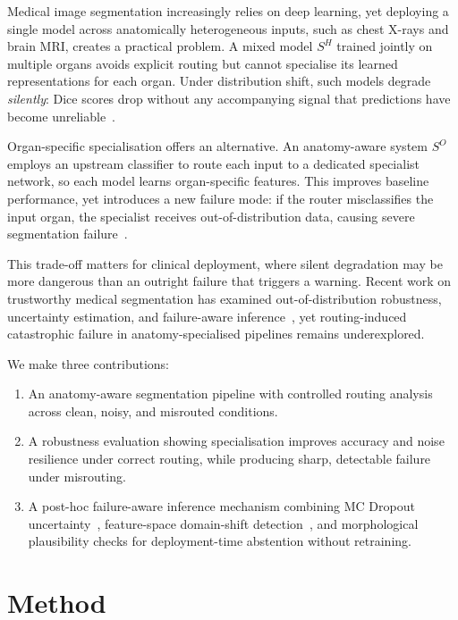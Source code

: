 \documentclass[a4paper,conference]{IEEEtran}
\begin{document}
Medical image segmentation increasingly relies on deep learning, yet deploying a single model across anatomically heterogeneous inputs, such as chest X-rays and brain MRI, creates a practical problem. A mixed model $S^H$ trained jointly on multiple organs avoids explicit routing but cannot specialise its learned representations for each organ. Under distribution shift, such models degrade \emph{silently}: Dice scores drop without any accompanying signal that predictions have become unreliable~\cite{b1,b2}.

Organ-specific specialisation offers an alternative. An anatomy-aware system $S^O$ employs an upstream classifier to route each input to a dedicated specialist network, so each model learns organ-specific features. This improves baseline performance, yet introduces a new failure mode: if the router misclassifies the input organ, the specialist receives out-of-distribution data, causing severe segmentation failure~\cite{b3}.

This trade-off matters for clinical deployment, where silent degradation may be more dangerous than an outright failure that triggers a warning. Recent work on trustworthy medical segmentation has examined out-of-distribution robustness, uncertainty estimation, and failure-aware inference~\cite{b3,b4,b5}, yet routing-induced catastrophic failure in anatomy-specialised pipelines remains underexplored.

We make three contributions:
\begin{enumerate}
\item An anatomy-aware segmentation pipeline with controlled routing analysis across clean, noisy, and misrouted conditions.
\item A robustness evaluation showing specialisation improves accuracy and noise resilience under correct routing, while producing sharp, detectable failure under misrouting.
\item A post-hoc failure-aware inference mechanism combining MC Dropout uncertainty~\cite{b6}, feature-space domain-shift detection~\cite{b7}, and morphological plausibility checks for deployment-time abstention without retraining.
\end{enumerate}

\section{Method}
\end{document}
